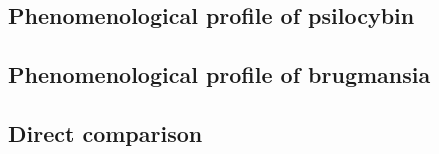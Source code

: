 \subsection{Phenomenological profile of psilocybin}

\subsection{Phenomenological profile of brugmansia}

\subsection{Direct comparison}
